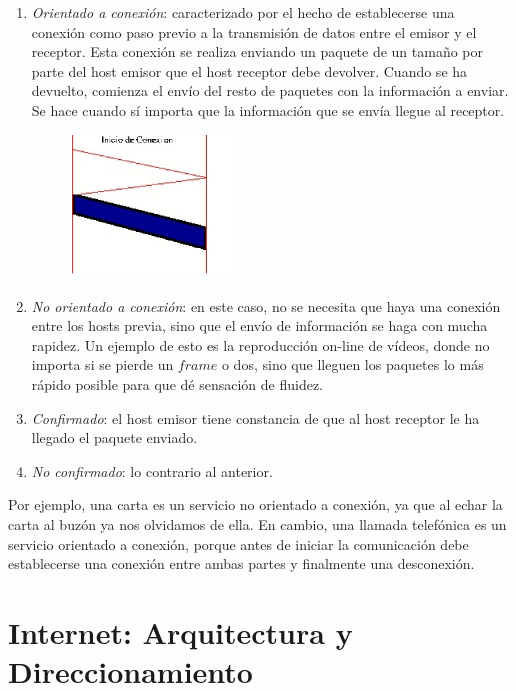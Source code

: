 \documentclass[10pt,a4paper,spanish]{report}
\begin{document}
\begin{enumerate}[\color{tema1}{$\heartsuit$}]
  \item \textit{\textcolor{tema1}{Orientado a conexión}}: caracterizado por el hecho de establecerse una conexión como paso previo a la transmisión de datos entre el emisor y el receptor. Esta conexión se realiza enviando un paquete de un tamaño por parte del host emisor que el host receptor debe devolver. Cuando se ha devuelto, comienza el envío del resto de paquetes con la información a enviar. Se hace cuando sí importa que la información que se envía llegue al receptor.

\begin{figure}[!h]
  \begin{center}
    \includegraphics[width=0.4\textwidth]{iniconec}
  \end{center}
\end{figure}
  \item \textit{\textcolor{tema1}{No orientado a conexión}}: en este caso, no se necesita que haya una conexión entre los hosts previa, sino que el envío de información se haga con mucha rapidez. Un ejemplo de esto es la reproducción on-line de vídeos, donde no importa si se pierde un $frame$ o dos, sino que lleguen los paquetes lo más rápido posible para que dé sensación de fluidez.
  \item \textit{\textcolor{tema1}{Confirmado}}: el host emisor tiene constancia de que al host receptor le ha llegado el paquete enviado.
  \item \textit{\textcolor{tema1}{No confirmado}}: lo contrario al anterior.
\end{enumerate}

Por ejemplo, una carta es un servicio no orientado a conexión, ya que al echar la carta al buzón ya nos olvidamos de ella. En cambio, una llamada telefónica es un servicio orientado a conexión, porque antes de iniciar la comunicación debe establecerse una conexión entre ambas partes y finalmente una desconexión.

\section{\textcolor{tema1}Internet: Arquitectura y Direccionamiento}
\end{document}
